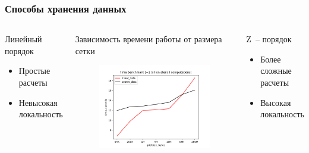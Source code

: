 \documentclass[presentation,18pt]{beamer}
\begin{document}
\begin{frame}[t]
	\label{data-order}
	\frametitle{Способы хранения данных}

	\begin{columns}

		\begin{block}{Линейный порядок}
			\begin{itemize}
				\item Простые расчеты
				\item Невысокая локальность
			\end{itemize}
		\end{block}

		\begin{alertblock}{Зависимость времени работы от размера сетки}
			\begin{figure}
				\includegraphics[width=\textwidth]{img/GraphOrder.png}
			\end{figure}
		\end{alertblock}

		\begin{block}{Z~-- порядок}
			\begin{itemize}
				\item Более сложные расчеты
				\item Высокая локальность
			\end{itemize}


\end{block}
\end{columns}
\end{frame}
\end{document}
